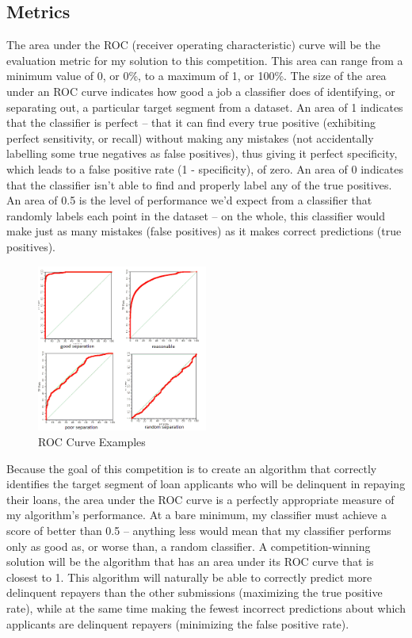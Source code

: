 \documentclass[12pt, letterpaper]{article}
\begin{document}
\subsection{Metrics}
The area under the ROC (receiver operating characteristic) curve\cite{wikipediaroc} will be the evaluation metric for my solution to this competition. This area can range from a minimum value of 0, or 0\%, to a maximum of 1, or 100\%. The size of the area under an ROC curve indicates how good a job a classifier does of identifying, or separating out, a particular target segment from a dataset. An area of 1 indicates that the classifier is perfect -- that it can find every true positive (exhibiting perfect sensitivity, or recall) without making any mistakes (not accidentally labelling some true negatives as false positives), thus giving it perfect specificity, which leads to a false positive rate (1 - specificity), of zero. An area of 0 indicates that the classifier isn't able to find and properly label any of the true positives. An area of 0.5 is the level of performance we'd expect from a classifier that randomly labels each point in the dataset -- on the whole, this classifier would make just as many mistakes (false positives) as it makes correct predictions (true positives).

\begin{figure}[ht]
\includegraphics[width=0.5\textwidth]{roccurves}
\centering
\caption{ROC Curve Examples\cite{mlwikirocanalysis}}
\end{figure}

Because the goal of this competition is to create an algorithm that correctly identifies the target segment of loan applicants who will be delinquent in repaying their loans, the area under the ROC curve is a perfectly appropriate measure of my algorithm's performance. At a bare minimum, my classifier must achieve a score of better than 0.5 -- anything less would mean that my classifier performs only as good as, or worse than, a random classifier. A competition-winning solution will be the algorithm that has an area under its ROC curve that is closest to 1. This algorithm will naturally be able to correctly predict more delinquent repayers than the other submissions (maximizing the true positive rate), while at the same time making the fewest incorrect predictions about which applicants are delinquent repayers (minimizing the false positive rate).
\end{document}
